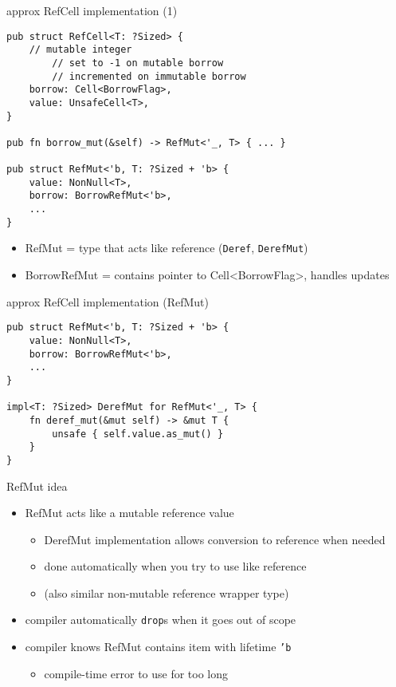 
\begin{frame}[fragile]{approx RefCell implementation (1)}
\begin{verbatim}
pub struct RefCell<T: ?Sized> {
    // mutable integer
        // set to -1 on mutable borrow
        // incremented on immutable borrow
    borrow: Cell<BorrowFlag>,
    value: UnsafeCell<T>,
}

pub fn borrow_mut(&self) -> RefMut<'_, T> { ... }

pub struct RefMut<'b, T: ?Sized + 'b> {
    value: NonNull<T>,
    borrow: BorrowRefMut<'b>,
    ...
}
\end{verbatim}
\begin{itemize}
\item RefMut = type that acts like reference (\texttt{Deref}, \texttt{DerefMut})
\item BorrowRefMut = contains pointer to Cell<BorrowFlag>, handles updates
\end{itemize}
\end{frame}

\begin{frame}[fragile]{approx RefCell implementation (RefMut)}
\begin{verbatim}
pub struct RefMut<'b, T: ?Sized + 'b> {
    value: NonNull<T>,
    borrow: BorrowRefMut<'b>,
    ...
}

impl<T: ?Sized> DerefMut for RefMut<'_, T> {
    fn deref_mut(&mut self) -> &mut T {
        unsafe { self.value.as_mut() }
    }
}
\end{verbatim}
\end{frame}

\begin{frame}{RefMut idea}
    \begin{itemize}
    \item RefMut acts like a mutable reference value
        \begin{itemize}
        \item DerefMut implementation allows conversion to reference when needed
        \item done automatically when you try to use like reference
        \item (also similar non-mutable reference wrapper type)
        \end{itemize}
    \item compiler automatically \texttt{drop}s when it goes out of scope
    \item compiler knows RefMut contains item with lifetime \texttt{'b}
        \begin{itemize}
        \item compile-time error to use for too long
        \end{itemize}
    \end{itemize}
\end{frame}


